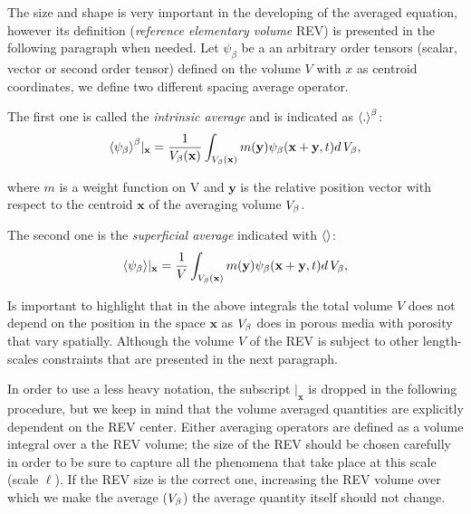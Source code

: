 The size and shape is very important in the developing of the averaged equation, however its definition (\textit{reference elementary volume} REV) is presented in the following paragraph when needed.
Let $\psi_{\beta}$ be a an arbitrary order tensors (scalar, vector or second order tensor) defined on the volume $V$ with $x$ as centroid coordinates, we define two different spacing average operator.

The first one is called the \textit{intrinsic average} and is indicated as ${\left< . \right>}^{\beta}$:
\begin{equation}
	{\left< \psi_{\beta} \right>}^{\beta}|_{\mathbf{x}} = \dfrac{1}{V_\beta(\mathbf{x})} \int_{V_\beta(\mathbf{x})}  m(\mathbf{y}) \psi_{\beta}(\mathbf{x}+\mathbf{y}, t) d \, V_\beta,
	\label{eq:avg_intrinsic}
\end{equation}

where $m$ is a weight function on V and $\mathbf{y}$ is the relative position vector with respect to the centroid $\mathbf{x}$ of the averaging volume $V_\beta$.

The second one is the \textit{superficial average} indicated with ${\left<  \right>}$:
\begin{equation}
	{\left< \psi_{\beta} \right>}|_{\mathbf{x}} = \dfrac{1}{V} \int_{V_\beta(\mathbf{x})} m(\mathbf{y}) \psi_{\beta}(\mathbf{x}+\mathbf{y}, t) d \, V_\beta,
	\label{eq:avg_superficial}
\end{equation}

Is important to highlight that in the above integrals the total volume $V$ does not depend on the position in the space $\mathbf{x}$ as $V_\beta$ does in porous media with porosity that vary spatially.
Although the volume $V$ of the REV is subject to other length-scales constraints that are presented in the next paragraph.


In order to use a less heavy notation, the subscript $|_{\mathbf{x}}$ is dropped in the following procedure, but we keep in mind that the volume averaged quantities are explicitly dependent on the REV center.
Either averaging operators are defined as a volume integral over a the REV volume; the size of the REV should be chosen carefully in order to be sure to capture all the phenomena that take place at this scale (scale $\ell$).
If the REV size is the correct one, increasing the REV volume over which we make the average ($V_\beta$) the average quantity itself should not change.

